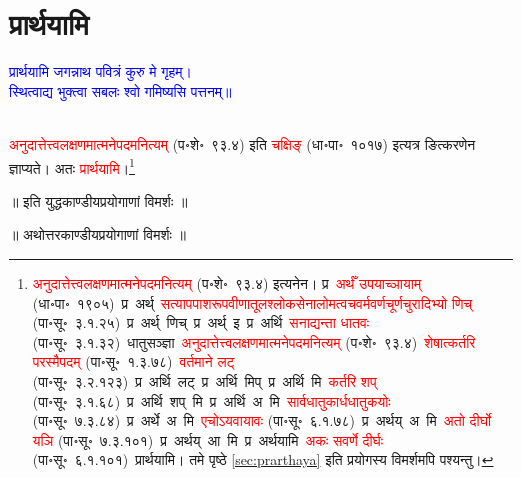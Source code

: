 \section[प्रार्थयामि]{प्रार्थयामि}
\label{sec:prarthayami}
\centering\textcolor{blue}{प्रार्थयामि जगन्नाथ पवित्रं कुरु मे गृहम्।\nopagebreak\\
स्थित्वाद्य भुक्त्वा सबलः श्वो गमिष्यसि पत्तनम्॥}\nopagebreak\\
\\
\fontsize{14}{21}\selectfont\begin{sloppypar}\justifying\noindent\hspace{10mm} \textcolor{red}{अनुदात्तेत्त्व\-लक्षणमात्मने\-पदमनित्यम्} (प॰शे॰~९३.४) इति \textcolor{red}{चक्षिङ्} (धा॰पा॰~१०१७) इत्यत्र ङित्करणेन ज्ञाप्यते। अतः \textcolor{red}{प्रार्थयामि}।\footnote{\textcolor{red}{अनुदात्तेत्त्व\-लक्षणमात्मने\-पदमनित्यम्} (प॰शे॰~९३.४) इत्यनेन। प्र~\textcolor{red}{अर्थँ उपयाच्ञायाम्} (धा॰पा॰~१९०५)~\arrow प्र~अर्थ्~\arrow \textcolor{red}{सत्याप\-पाश\-रूप\-वीणा\-तूल\-श्लोक\-सेना\-लोम\-त्वच\-वर्म\-वर्ण\-चूर्ण\-चुरादिभ्यो णिच्} (पा॰सू॰~३.१.२५)~\arrow प्र~अर्थ्~णिच्~\arrow प्र~अर्थ्~इ~\arrow प्र~अर्थि~\arrow \textcolor{red}{सनाद्यन्ता धातवः} (पा॰सू॰~३.१.३२)~\arrow धातु\-सञ्ज्ञा~\arrow \textcolor{red}{अनुदात्तेत्त्व\-लक्षणमात्मने\-पदमनित्यम्} (प॰शे॰~९३.४)~\arrow \textcolor{red}{शेषात्कर्तरि परस्मैपदम्} (पा॰सू॰~१.३.७८)~\arrow \textcolor{red}{वर्तमाने लट्} (पा॰सू॰~३.२.१२३)~\arrow प्र~अर्थि~लट्~\arrow प्र~अर्थि~मिप्~\arrow प्र~अर्थि~मि~\arrow \textcolor{red}{कर्तरि शप्‌} (पा॰सू॰~३.१.६८)~\arrow प्र~अर्थि~शप्~मि~\arrow प्र~अर्थि~अ~मि~\arrow \textcolor{red}{सार्वधातुकार्ध\-धातुकयोः} (पा॰सू॰~७.३.८४)~\arrow प्र~अर्थे~अ~मि~\arrow \textcolor{red}{एचोऽयवायावः} (पा॰सू॰~६.१.७८)~\arrow प्र~अर्थय्~अ~मि~\arrow \textcolor{red}{अतो दीर्घो यञि} (पा॰सू॰~७.३.१०१)~\arrow प्र~अर्थय्~आ~मि~\arrow प्र~अर्थयामि~\arrow \textcolor{red}{अकः सवर्णे दीर्घः} (पा॰सू॰~६.१.१०१)~\arrow प्रार्थयामि। \pageref{sec:prarthaya}तमे पृष्ठे \ref{sec:prarthaya}  इति प्रयोगस्य विमर्शमपि पश्यन्तु।}\end{sloppypar}
\vspace{2mm}
\centering ॥ इति युद्धकाण्डीयप्रयोगाणां विमर्शः ॥\nopagebreak\\
\vspace{4mm}
{}
\centering ॥ अथोत्तरकाण्डीयप्रयोगाणां विमर्शः ॥\nopagebreak\\
